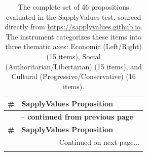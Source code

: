 \documentclass[11pt]{article}
\begin{document}
\begin{longtable}{r p{0.9\linewidth}}
\caption{The complete set of 46 propositions evaluated in the SapplyValues test, sourced directly from \url{https://sapplyvalues.github.io}. The instrument categorizes these items into three thematic axes: \colorbox{svEcon}{Economic (Left/Right)} (15 items), \colorbox{svAuth}{Social (Authoritarian/Libertarian)} (15 items), and \colorbox{svProg}{Cultural (Progressive/Conservative)} (16 items).}
\label{tab:sapply_propositions} \\
\toprule
\textbf{\#} & \textbf{SapplyValues Proposition} \\
\midrule
\endfirsthead

\multicolumn{2}{c}{{\bfseries \tablename\ \thetable{} -- continued from previous page}} \\
\toprule
\textbf{\#} & \textbf{SapplyValues Proposition} \\
\midrule
\endhead

\midrule
\multicolumn{2}{r}{{Continued on next page...}} \\
\endfoot

\bottomrule
\endlastfoot


\end{longtable}
\end{document}
